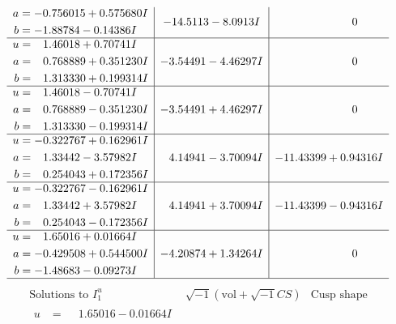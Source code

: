 \documentclass[1p]{elsarticle_modified}
\theoremstyle{definition}
\newcommand{\I}{\sqrt{-1}}
\begin{document}
$$\begin{array}{c|c|c}
\begin{aligned}
a &= -0.756015 + 0.575680 I \\
b &= -1.88784 - 0.14386 I\end{aligned}
 & -14.5113 - 8.0913 I & \phantom{-0.000000 } 0 \\ \hline\begin{aligned}
u &= \phantom{-}1.46018 + 0.70741 I \\
a &= \phantom{-}0.768889 + 0.351230 I \\
b &= \phantom{-}1.313330 + 0.199314 I\end{aligned}
 & -3.54491 - 4.46297 I & \phantom{-0.000000 } 0 \\ \hline\begin{aligned}
u &= \phantom{-}1.46018 - 0.70741 I \\
a &= \phantom{-}0.768889 - 0.351230 I \\
b &= \phantom{-}1.313330 - 0.199314 I\end{aligned}
 & -3.54491 + 4.46297 I & \phantom{-0.000000 } 0 \\ \hline\begin{aligned}
u &= -0.322767 + 0.162961 I \\
a &= \phantom{-}1.33442 - 3.57982 I \\
b &= \phantom{-}0.254043 + 0.172356 I\end{aligned}
 & \phantom{-}4.14941 - 3.70094 I & -11.43399 + 0.94316 I \\ \hline\begin{aligned}
u &= -0.322767 - 0.162961 I \\
a &= \phantom{-}1.33442 + 3.57982 I \\
b &= \phantom{-}0.254043 - 0.172356 I\end{aligned}
 & \phantom{-}4.14941 + 3.70094 I & -11.43399 - 0.94316 I \\ \hline\begin{aligned}
u &= \phantom{-}1.65016 + 0.01664 I \\
a &= -0.429508 + 0.544500 I \\
b &= -1.48683 - 0.09273 I\end{aligned}
 & -4.20874 + 1.34264 I & \phantom{-0.000000 } 0\\
 \hline 
 \end{array}$$\newpage$$\begin{array}{c|c|c}  
\text{Solutions to }I^u_{1}& \I (\text{vol} + \sqrt{-1}CS) & \text{Cusp shape}\\
 \hline 
\begin{aligned}
u &= \phantom{-}1.65016 - 0.01664 I \\

\end{aligned}
\end{array}$$
\end{document}

